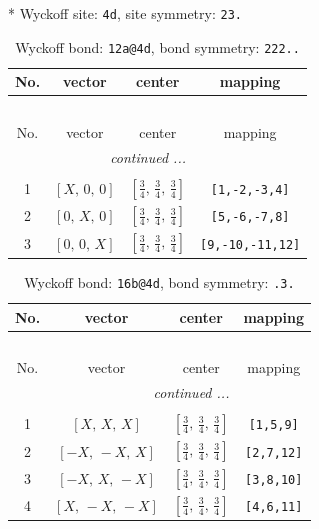 \documentclass[fleqn,8pt]{jsarticle}
\begin{document}
* Wyckoff site: {\tt 4d}, site symmetry: {\tt 23.}
\renewcommand{\arraystretch}{1.2}
\begin{longtable}{cccc}
\caption{Wyckoff bond: {\tt 12a@4d}, bond symmetry: {\tt 222..}}
 \\
 \hline \hline
No. & vector & center & mapping \\ \hline \endfirsthead

\multicolumn{3}{l}{\tablename\ \thetable{}} \\
 \hline \hline
No. & vector & center & mapping \\ \hline \endhead

 \hline \hline
\multicolumn{3}{r}{\footnotesize\it continued ...} \\ \endfoot

 \hline \hline
\multicolumn{3}{r}{} \\ \endlastfoot

1 & $\left[ X,\, 0,\, 0 \right]$ & $\left[ \frac{3}{4},\, \frac{3}{4},\, \frac{3}{4} \right]$ & {\tt [1,-2,-3,4]} \\ \hline
2 & $\left[ 0,\, X,\, 0 \right]$ & $\left[ \frac{3}{4},\, \frac{3}{4},\, \frac{3}{4} \right]$ & {\tt [5,-6,-7,8]} \\ \hline
3 & $\left[ 0,\, 0,\, X \right]$ & $\left[ \frac{3}{4},\, \frac{3}{4},\, \frac{3}{4} \right]$ & {\tt [9,-10,-11,12]} \\
\end{longtable}
\renewcommand{\arraystretch}{1.2}
\begin{longtable}{cccc}
\caption{Wyckoff bond: {\tt 16b@4d}, bond symmetry: {\tt .3.}}
 \\
 \hline \hline
No. & vector & center & mapping \\ \hline \endfirsthead

\multicolumn{3}{l}{\tablename\ \thetable{}} \\
 \hline \hline
No. & vector & center & mapping \\ \hline \endhead

 \hline \hline
\multicolumn{3}{r}{\footnotesize\it continued ...} \\ \endfoot

 \hline \hline
\multicolumn{3}{r}{} \\ \endlastfoot

1 & $\left[ X,\, X,\, X \right]$ & $\left[ \frac{3}{4},\, \frac{3}{4},\, \frac{3}{4} \right]$ & {\tt [1,5,9]} \\ \hline
2 & $\left[ - X,\, - X,\, X \right]$ & $\left[ \frac{3}{4},\, \frac{3}{4},\, \frac{3}{4} \right]$ & {\tt [2,7,12]} \\ \hline
3 & $\left[ - X,\, X,\, - X \right]$ & $\left[ \frac{3}{4},\, \frac{3}{4},\, \frac{3}{4} \right]$ & {\tt [3,8,10]} \\ \hline
4 & $\left[ X,\, - X,\, - X \right]$ & $\left[ \frac{3}{4},\, \frac{3}{4},\, \frac{3}{4} \right]$ & {\tt [4,6,11]} \\
\end{longtable}
\end{document}
